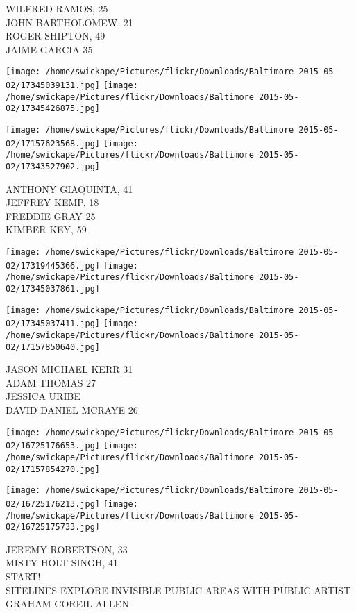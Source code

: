 \documentclass[10pt,letterpaper]{article}
\begin{document}
WILFRED RAMOS, 25\\
JOHN BARTHOLOMEW, 21\\
ROGER SHIPTON, 49\\
JAIME GARCIA 35
\pagebreak

\texttt{[image: /home/swickape/Pictures/flickr/Downloads/Baltimore 2015-05-02/17345039131.jpg]}
\texttt{[image: /home/swickape/Pictures/flickr/Downloads/Baltimore 2015-05-02/17345426875.jpg]}

\texttt{[image: /home/swickape/Pictures/flickr/Downloads/Baltimore 2015-05-02/17157623568.jpg]}
\texttt{[image: /home/swickape/Pictures/flickr/Downloads/Baltimore 2015-05-02/17343527902.jpg]}

ANTHONY GIAQUINTA, 41\\
JEFFREY KEMP, 18\\
FREDDIE GRAY 25\\
KIMBER KEY, 59
\pagebreak

\texttt{[image: /home/swickape/Pictures/flickr/Downloads/Baltimore 2015-05-02/17319445366.jpg]}
\texttt{[image: /home/swickape/Pictures/flickr/Downloads/Baltimore 2015-05-02/17345037861.jpg]}

\texttt{[image: /home/swickape/Pictures/flickr/Downloads/Baltimore 2015-05-02/17345037411.jpg]}
\texttt{[image: /home/swickape/Pictures/flickr/Downloads/Baltimore 2015-05-02/17157850640.jpg]}

JASON MICHAEL KERR 31\\
ADAM THOMAS 27\\
JESSICA URIBE\\
DAVID DANIEL MCRAYE 26
\pagebreak

\texttt{[image: /home/swickape/Pictures/flickr/Downloads/Baltimore 2015-05-02/16725176653.jpg]}
\texttt{[image: /home/swickape/Pictures/flickr/Downloads/Baltimore 2015-05-02/17157854270.jpg]}

\texttt{[image: /home/swickape/Pictures/flickr/Downloads/Baltimore 2015-05-02/16725176213.jpg]}
\texttt{[image: /home/swickape/Pictures/flickr/Downloads/Baltimore 2015-05-02/16725175733.jpg]}

JEREMY ROBERTSON, 33\\
MISTY HOLT SINGH, 41\\
START!\\
SITELINES EXPLORE INVISIBLE PUBLIC AREAS WITH PUBLIC ARTIST GRAHAM COREIL{-}ALLEN
\pagebreak
\end{document}
